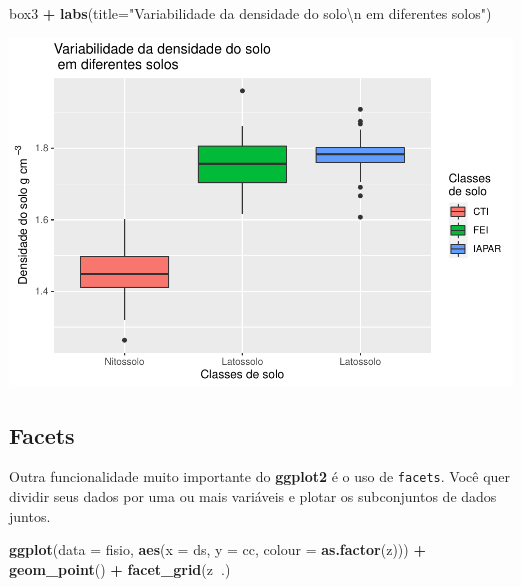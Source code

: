 \documentclass[]{book}
\newenvironment{Shaded}{\begin{snugshade}}{\end{snugshade}}
\newcommand{\CharTok}[1]{\textcolor[rgb]{0.31,0.60,0.02}{#1}}
\newcommand{\DataTypeTok}[1]{\textcolor[rgb]{0.13,0.29,0.53}{#1}}
\newcommand{\KeywordTok}[1]{\textcolor[rgb]{0.13,0.29,0.53}{\textbf{#1}}}
\newcommand{\NormalTok}[1]{#1}
\newcommand{\OperatorTok}[1]{\textcolor[rgb]{0.81,0.36,0.00}{\textbf{#1}}}
\newcommand{\StringTok}[1]{\textcolor[rgb]{0.31,0.60,0.02}{#1}}
\begin{document}
\begin{Shaded}
\begin{Highlighting}[]
\NormalTok{box3 }\OperatorTok{+}\StringTok{ }\KeywordTok{labs}\NormalTok{(}\DataTypeTok{title=}\StringTok{"Variabilidade da densidade do solo}\CharTok{\textbackslash{}n}\StringTok{ em diferentes solos"}\NormalTok{)}
\end{Highlighting}
\end{Shaded}

\includegraphics{TudodoR_files/figure-latex/unnamed-chunk-219-2.pdf}

\hypertarget{facets}{%
\subsection{Facets}\label{facets}}

Outra funcionalidade muito importante do \textbf{ggplot2} é o uso de \texttt{facets}.
Você quer dividir seus dados por uma ou mais variáveis e plotar os subconjuntos de dados juntos.

\begin{Shaded}
\begin{Highlighting}[]
\KeywordTok{ggplot}\NormalTok{(}\DataTypeTok{data =}\NormalTok{ fisio, }\KeywordTok{aes}\NormalTok{(}\DataTypeTok{x =}\NormalTok{ ds, }\DataTypeTok{y =}\NormalTok{ cc, }\DataTypeTok{colour =} \KeywordTok{as.factor}\NormalTok{(z))) }\OperatorTok{+}
\StringTok{  }\KeywordTok{geom_point}\NormalTok{() }\OperatorTok{+}
\StringTok{  }\KeywordTok{facet_grid}\NormalTok{(z}\OperatorTok{~}\NormalTok{.)}
\end{Highlighting}
\end{Shaded}
\end{document}
